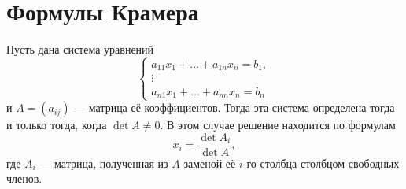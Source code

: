 \section{Формулы Крамера}

\begin{theorem}[Крамер]
    Пусть дана система уравнений
    $$
    \begin{cases}
        a_{11}x_1 + \ldots + a_{1n}x_n = b_1,\\
        \vdots\\
        a_{n1}x_1 + \ldots + a_{nn}x_n = b_n
    \end{cases}
    $$
    и $A = (a_{ij})$ --- матрица её коэффициентов. Тогда эта система определена тогда и только тогда, когда \mbox{$\det A \ne 0$}. В этом случае решение находится по формулам
    $$
    x_i = \frac{\det A_i}{\det A},
    $$
    где $A_i$ --- матрица, полученная из $A$ заменой её $i$-го столбца столбцом свободных членов.
\end{theorem}


